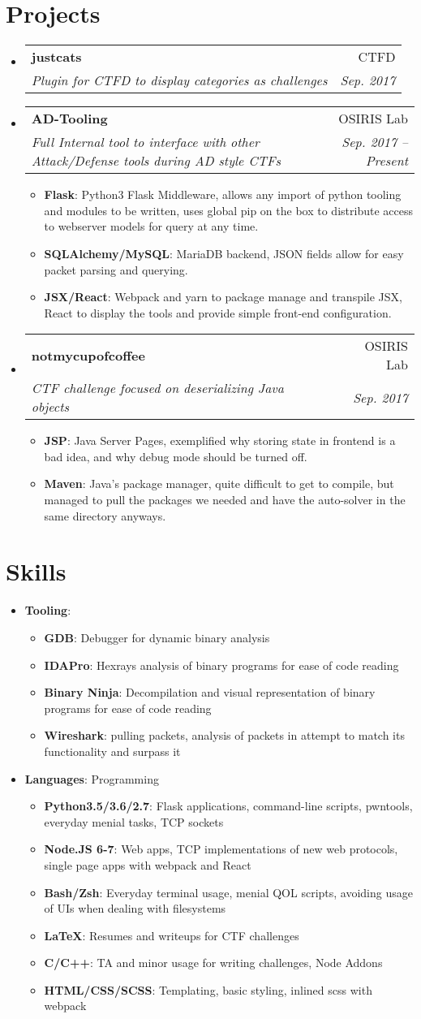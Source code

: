 \documentclass[letterpaper,10pt]{article}
\makeatletter
\newcommand{\resumeItem}[2]{
  \item\small{
    \textbf{#1}{: #2 \vspace{-2pt}}
  }
}
\newcommand{\resumeSubheading}[4]{
  \vspace{-3pt}\item
    \begin{tabular*}{0.97\textwidth}{l@{\extracolsep{\fill}}r}
      \textbf{#1} & #2 \\
      \textit{\small#3} & \textit{\small #4} \\
    \end{tabular*}\vspace{-5pt}
}
\newcommand{\resumeSubHeadingListStart}{\begin{itemize}[leftmargin=*]}
\newcommand{\resumeSubHeadingListEnd}{\end{itemize}}
\newcommand{\resumeItemListStart}{\begin{itemize}}
\newcommand{\resumeItemListEnd}{\end{itemize}\vspace{-5pt}}
\makeatother
\begin{document}
\section{Projects}
\resumeSubHeadingListStart
  \resumeSubheading
    {justcats}{CTFD}
    {Plugin for CTFD to display categories as challenges}{Sep. 2017}

  \resumeSubheading
    {AD-Tooling}{OSIRIS Lab}
    {Full Internal tool to interface with other Attack/Defense tools during AD style CTFs}{Sep. 2017 -- Present}
    \resumeItemListStart
      \resumeItem{Flask}{Python3 Flask Middleware, allows any import of python tooling and modules to be written, uses global pip on the box to distribute access to webserver models for query at any time.}
      \resumeItem{SQLAlchemy/MySQL}{MariaDB backend, JSON fields allow for easy packet parsing and querying.}
      \resumeItem{JSX/React}{Webpack and yarn to package manage and transpile JSX, React to display the tools and provide simple front-end configuration.}
    \resumeItemListEnd

  \resumeSubheading
    {notmycupofcoffee}{OSIRIS Lab}
    {CTF challenge focused on deserializing Java objects}{Sep. 2017}
    \resumeItemListStart
      \resumeItem{JSP}{Java Server Pages, exemplified why storing state in frontend is a bad idea, and why debug mode should be turned off.}
      \resumeItem{Maven}{Java's package manager, quite difficult to get to compile, but managed to pull the packages we needed and have the auto-solver in the same directory anyways.}
    \resumeItemListEnd
\resumeSubHeadingListEnd

\section{Skills}
\resumeSubHeadingListStart
  \resumeItem{Tooling}{}
    \resumeItemListStart
    \resumeItem{GDB}{Debugger for dynamic binary analysis}
    \resumeItem{IDAPro}{Hexrays analysis of binary programs for ease of code reading}
    \resumeItem{Binary Ninja}{Decompilation and visual representation of binary programs for ease of code reading}
    \resumeItem{Wireshark}{pulling packets, analysis of packets in attempt to match its functionality and surpass it}
    \resumeItemListEnd
  \resumeItem{Languages}{Programming}
    \resumeItemListStart
    \resumeItem{Python3.5/3.6/2.7}{Flask applications, command-line scripts, pwntools, everyday menial tasks, TCP sockets}
    \resumeItem{Node.JS 6-7}{Web apps, TCP implementations of new web protocols, single page apps with webpack and React}
    \resumeItem{Bash/Zsh}{Everyday terminal usage, menial QOL scripts, avoiding usage of UIs when dealing with filesystems}
    \resumeItem{\LaTeX}{Resumes and writeups for CTF challenges}
    \resumeItem{C/C++}{TA and minor usage for writing challenges, Node Addons}
    \resumeItem{HTML/CSS/SCSS}{Templating, basic styling, inlined scss with webpack}
    \resumeItemListEnd
\resumeSubHeadingListEnd
\end{document}
